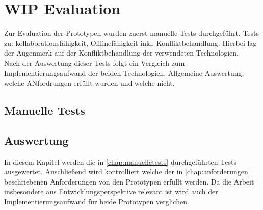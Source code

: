 \chapter{\label{chap:evaluation}WIP Evaluation}
Zur Evaluation der Prototypen wurden zuerst manuelle Tests durchgeführt. 
Tests zu: kollaborationsfähigkeit, Offlinefähigkeit inkl. Konfliktbehandlung.
Hierbei lag der Augenmerk auf der  Konfliktbehandlung der verwendeten Technologien.\\
Nach der Auswertung dieser Tests folgt ein Vergleich zum Implementierungsaufwand der beiden Technologien.
Allgemeine Auswertung, welche ANfordrungen erfüllt wurden und welche nicht.
%
%
\section{\label{chap:manuelletests}Manuelle Tests}

%
%
\section{\label{chap:auswertung}Auswertung}
In diesem Kapitel werden die in \autoref{chap:manuelletests} durchgeführten Tests ausgewertet.
Anschließend wird kontrolliert welche der in \autoref{chap:anforderungen} beschriebenen Anforderungen von den Prototypen erfüllt werden.
Da die Arbeit insbesondere aus Entwicklungsperspektive relevant ist wird auch der Implementierungsaufwand für beide Prototypen verglichen.

